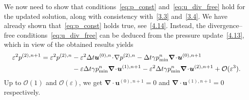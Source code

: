 \documentclass[A4paper,12pt,twoside]{article}
\newenvironment{proof}{{\flushleft \bf Proof:}}{}
\numberwithin{equation}{section}
\numberwithin{figure}{section}
\numberwithin{table}{section}
\def\bnabla{\bm{\nabla}}
\newcommand{\dt}{\Delta t}
\newcommand{\ve}{\varepsilon}
\newcommand\eref[1]{(\ref{#1})}
\begin{document}
\begin{proof}

We now need to show that conditions~\eqref{eq:p_const} and~\eqref{eq:u_div_free} hold for the updated solution, along with consistency with~\eqref{3.3} and~\eqref{3.4}.
%
We have already shown that~\eqref{eq:p_const} holds true, see~\eqref{4.14}.
%
Instead, the divergence--free conditions~\eqref{eq:u_div_free} can be deduced from the pressure update~\eqref{4.13}, which in view of the obtained results yields
$$\begin{aligned}
	\ve^2 p^{(2),n+1}=\ve^2 p^{(2),n}&-\ve^2 \dt \bm u^{(0),n}\!\cdot\!\nabla p^{(2),n} -\dt\gamma p_{\min}^n\bnabla\!\cdot\!\bm u^{(0),n+1}\\
	&-\ve\dt\gamma p_{\min}^n\bnabla\!\cdot\!\bm u^{(1),n+1}-\ve^2\dt\gamma p_{\min}^n\bnabla\!\cdot\!\bm u^{(2),n+1}+{\cal O}(\ve^3).
\end{aligned}$$
Up to $\mathcal{O}(1)$ and $\mathcal{O}(\ve)$, we get $\bnabla\!\cdot\!\bm u^{(0),n+1}=0$ and $\bnabla\!\cdot\!\bm u^{(1),n+1}=0$ respectively.


\end{proof}
\end{document}
